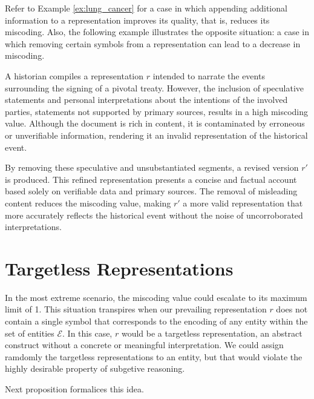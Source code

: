 Refer to Example \ref{ex:lung_cancer} for a case in which appending additional information to a representation improves its quality, that is, reduces its miscoding. Also, the following example illustrates the opposite situation: a case in which removing certain symbols from a representation can lead to a decrease in miscoding.

\begin{example}
A historian compiles a representation $r$ intended to narrate the events surrounding the signing of a pivotal treaty. However, the inclusion of speculative statements and personal interpretations about the intentions of the involved parties, statements not supported by primary sources, results in a high miscoding value. Although the document is rich in content, it is contaminated by erroneous or unverifiable information, rendering it an invalid representation of the historical event.

By removing these speculative and unsubstantiated segments, a revised version $r'$ is produced. This refined representation presents a concise and factual account based solely on verifiable data and primary sources. The removal of misleading content reduces the miscoding value, making $r'$ a more valid representation that more accurately reflects the historical event without the noise of uncorroborated interpretations.
\end{example}

%
%

\section{Targetless Representations}
\label{sec:targetless_representations}

In the most extreme scenario, the miscoding value could escalate to its maximum limit of 1. This situation transpires when our prevailing representation $r$ does not contain a single symbol that corresponds to the encoding of any entity within the set of entities $\mathcal{E}$. In this case, $r$ would be a targetless representation, an abstract construct without a concrete or meaningful interpretation. We could assign ramdomly the targetless representations to an entity, but that would violate the highly desirable property of subgetive reasoning.

Next proposition formalices this idea.

